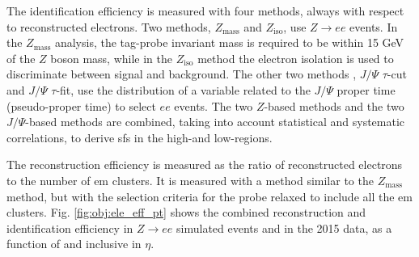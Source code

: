 The identification efficiency is measured with four methods, always with respect to reconstructed electrons. Two methods, $Z_\mathrm{mass}$ and $Z_\mathrm{iso}$, use $Z\rightarrow e e$ events. 
In the $Z_\mathrm{mass}$ analysis, the tag-probe invariant mass is required to be within 15 GeV of the $Z$ boson mass, while in the $Z_\mathrm{iso}$ method the electron isolation is used to discriminate between signal and background. The other two methods \cite{ATLAS:2014wga}, $J/\Psi$ $\tau$-cut and $J/\Psi$ $\tau$-fit, use the distribution of a variable related to the $J/\Psi$ proper time (pseudo-proper time) to select $ee$ events. 
The two $Z$-based methods and the two $J/\Psi$-based methods are combined, taking into account statistical and systematic correlations, to 
derive \glspl{sf} in the high-\et and low-\et regions. 


The reconstruction efficiency is measured as the ratio of reconstructed electrons to the number of \gls{em} clusters. 
It is measured with a method similar to the $Z_\mathrm{mass}$ method, but with the selection criteria for the probe relaxed to include all the \gls{em} clusters. Fig. \ref{fig:obj:ele_eff_pt} shows the combined reconstruction and identification efficiency in $Z\rightarrow e e$ simulated events and in the 2015 data, as a function of \et and inclusive in $\eta$.

